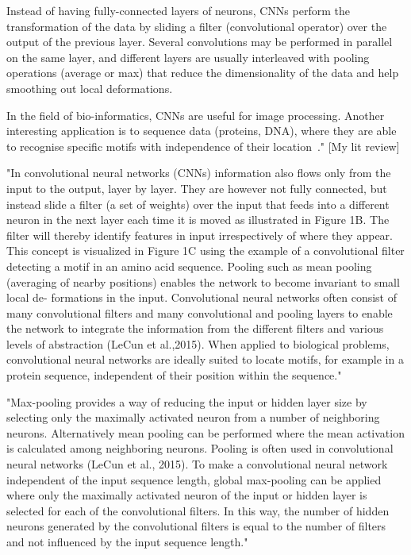 	Instead of having fully-connected layers of neurons, CNNs perform the transformation of the data by sliding a filter (convolutional operator) over the output of the previous layer. Several convolutions may be performed in parallel on the same layer, and different layers are usually interleaved with pooling operations (average or max) that reduce the dimensionality of the data and help smoothing out local deformations.
	
	In the field of bio-informatics, CNNs are useful for image processing. Another interesting application is to sequence data (proteins, DNA), where they are able to recognise specific motifs with independence of their location~\cite{Jurtz2017}." [My lit review]
	
	"In convolutional neural networks (CNNs) information also flows only from the input to the output, layer by layer. They are however not fully connected, but instead slide a filter (a set of weights) over the input that feeds into a different neuron in the next layer each time it is moved as illustrated in Figure 1B. The filter will thereby identify features in input irrespectively of where they appear. This concept is visualized in Figure 1C using the example of a convolutional filter detecting a motif in an amino acid sequence. Pooling such as mean pooling (averaging of nearby positions) enables the network to become invariant to small local de- formations in the input. Convolutional neural networks often consist of many convolutional filters and many convolutional and pooling layers to enable the network to integrate the information from the different filters and various levels of abstraction (LeCun et al.,2015). When applied to biological problems, convolutional neural networks are ideally suited to locate motifs, for example in a protein sequence, independent of their position within the sequence." \cite{Jurtz2017}
	
	"Max-pooling provides a way of reducing the input or hidden layer size by selecting only the maximally activated neuron from a number of neighboring neurons. Alternatively mean pooling can be performed where the mean activation is calculated among neighboring neurons. Pooling is often used in convolutional neural networks (LeCun et al., 2015). To make a convolutional neural network independent of the input sequence length, global max-pooling can be applied where only the maximally activated neuron of the input or hidden layer is selected for each of the convolutional filters. In this way, the number of hidden neurons generated by the convolutional filters is equal to the number of filters and not influenced by the input sequence length." \cite{Jurtz2017}
	
